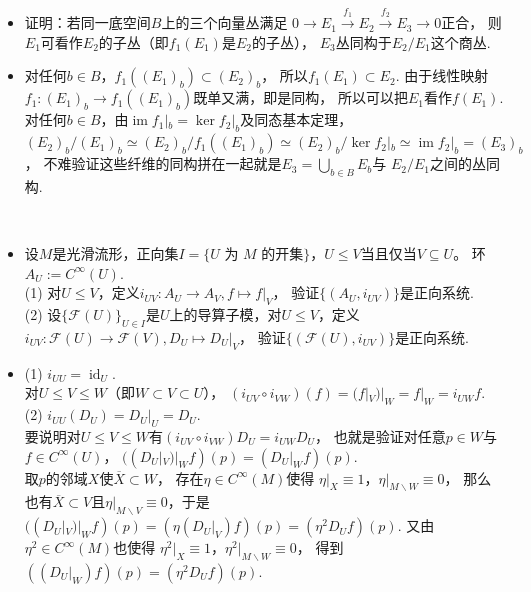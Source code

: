 \begin{itemize}
    
    ~\\
    \item[5.]
    证明：若同一底空间$B$上的三个向量丛满足
    $0\rightarrow E_1\xrightarrow{f_1} E_2\xrightarrow{f_2} E_3\rightarrow0$正合，
    则$E_1$可看作$E_2$的子丛（即$f_1(E_1)$是$E_2$的子丛），
    $E_3$丛同构于$E_2/E_1$这个商丛.

    \item[\textit{Pf:}]
    对任何$b\in B$，$f_1((E_1)_b)\subset(E_2)_b$，
    所以$f_1(E_1)\subset E_2$. 
    由于线性映射$f_1\colon (E_1)_b\rightarrow f_1((E_1)_b)$既单又满，即是同构，
    所以可以把$E_1$看作$f(E_1)$.\\
    对任何$b\in B$，由$\operatorname{im} f_1|_b=\ker f_2|_b$及同态基本定理，
    $(E_2)_b/(E_1)_b\simeq(E_2)_b/f_1((E_1)_b)\simeq(E_2)_b/\ker f_2|_b
    \simeq\operatorname{im} f_2|_b=(E_3)_b$，
    不难验证这些纤维的同构拼在一起就是$E_3=\bigcup\limits_{b\in B}E_b$与
    $E_2/E_1$之间的丛同构.
    
    ~\\
    \item[6.]
    设$M$是光滑流形，正向集$I=\{U\text{ 为 }M\text{ 的开集}\}$，$U\leq V$当且仅当$V\subseteq U$。
    环$A_U:=C^\infty(U)$.\\
    (1) 对$U\leq V$，定义$i_{UV}\colon A_U\rightarrow A_V,f\mapsto f|_V$，
    验证$\{(A_U,i_{UV})\}$是正向系统.\\
    (2) 设$\{\mathcal{F}(U)\}_{U\in I}$是$U$上的导算子模，对$U\leq V$，定义
    $i_{UV}\colon\mathcal{F}(U)\rightarrow \mathcal{F}(V),D_U\mapsto D_U|_V$，
    验证$\{(\mathcal{F}(U),i_{UV})\}$是正向系统.

    \item[\textit{Pf:}]
    (1) $i_{UU}=\operatorname{id}_U$.\\
    对$U\leq V\leq W$（即$W\subset V\subset U$），
    $(i_{UV}\circ i_{VW})(f)=(f|_V)|_W=f|_W=i_{UW}f$.\\
    (2) $i_{UU}(D_U)=D_U|_U=D_U$.\\
    要说明对$U\leq V\leq W$有$(i_{UV}\circ i_{VW})D_U=i_{UW}D_U$，
    也就是验证对任意$p\in W$与$f\in C^\infty(U)$，
    $((D_U|_V)|_Wf)(p)=(D_U|_Wf)(p)$.\\
    取$p$的邻域$X$使$\overline{X}\subset W$，
    存在$\eta\in C^\infty(M)$使得
    $\eta|_X\equiv1$，$\eta|_{M\backslash W}\equiv0$，
    那么也有$\overline{X}\subset V$且$\eta|_{M\backslash V}\equiv0$，于是
    $((D_U|_V)|_Wf)(p)=(\eta(D_U|_V)f)(p)=(\eta^2 D_Uf)(p)$.
    又由$\eta^2\in C^\infty(M)$也使得
    $\eta^2|_X\equiv1$，$\eta^2|_{M\backslash W}\equiv0$，
    得到$((D_U|_W)f)(p)=(\eta^2 D_Uf)(p)$.
    

\end{itemize}
